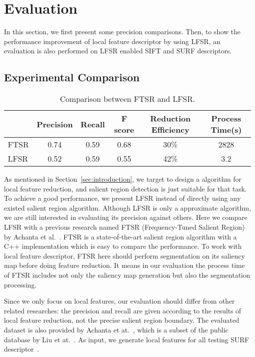 \section{Evaluation}
\label{sec:evaluation}

In this section, we first present some precision comparisons. Then, to show the performance improvement of local feature descriptor by using LFSR, an evaluation is also performed on LFSR enabled SIFT and SURF descriptors.

\subsection{Experimental Comparison}
\label{sec:evaluation_comparison}

\begin{table*}[!t]
\begin{center}
\begin{tabular}{|l|c|c|c|c|c|}
\hline
 & Precision & Recall & F score & Reduction Efficiency & Process Time(s) \\
\hline\hline
FTSR & 0.74 & 0.59 & 0.68 & 30\% & 2828 \\
LFSR & 0.52 & 0.59 & 0.55 & 42\% & 3.2 \\
\hline
\end{tabular}
\end{center}
\caption{Comparison between FTSR and LFSR.}
\label{tab:comparison}
\end{table*}

As mentioned in Section~\ref{sec:introduction}, we target to design a algorithm for local feature reduction, and salient region detection is just suitable for that task. To achieve a good performance, we present LFSR instead of directly using any existed salient region algorithm. Although LFSR is only a approximate algorithm, we are still interested in evaluating its precision against others. Here we compare LFSR with a previous research named FTSR (Frequency-Tuned Salient Region) by Achanta et al.~\cite{achanta2009frequency}. FTSR is a state-of-the-art salient region algorithm with a C++ implementation which is easy to compare the performance. To work with local feature descriptor, FTSR here should perform segmentation on its saliency map before doing feature reduction. It means in our evaluation the process time of FTSR includes not only the saliency map generation but also the segmentation processing.

Since we only focus on local features, our evaluation should differ from other related researches: the precision and recall are given according to the results of local feature reduction, not the precise salient region boundary. The evaluated dataset is also provided by Achanta et at.~\cite{achanta2009frequency}, which is a subset of the public database by Liu et at.~\cite{liu2011learning}. As input, we generate local features for all testing SURF descriptor~\cite{evans2010opensurf}. 

